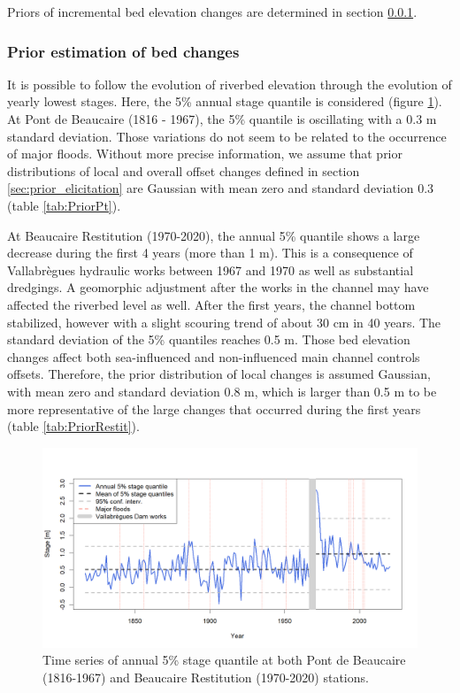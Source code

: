 \documentclass[11pt]{article}
\begin{document}
        Priors of incremental bed elevation changes are determined in section \ref{sec:stageevolution}.

    \subsubsection{Prior estimation of bed changes}
    \label{sec:stageevolution}
    
    It is possible to follow the evolution of riverbed elevation through the evolution of yearly lowest stages. Here, the 5\% annual stage quantile is considered (figure \ref{fig:quantile5_both}). At Pont de Beaucaire (1816 - 1967), the 5\% quantile is oscillating with a 0.3 m standard deviation. Those variations do not seem to be related to the occurrence of major floods. Without more precise information, we assume that prior distributions of local and overall offset changes defined in section \ref{sec:prior_elicitation} are Gaussian with mean zero and standard deviation 0.3 (table \ref{tab:PriorPt}).
    
    At Beaucaire Restitution (1970-2020), the annual 5\% quantile shows a large decrease during the first 4 years (more than 1 m). This is a consequence of Vallabrègues hydraulic works between 1967 and 1970 as well as substantial dredgings. A geomorphic adjustment after the works in the channel may have affected the riverbed level as well. After the first years, the channel bottom stabilized, however with a slight scouring trend of about 30 cm in 40 years. The standard deviation of the 5\% quantiles reaches 0.5 m. Those bed elevation changes affect both sea-influenced and non-influenced main channel controls offsets. Therefore, the prior distribution of local changes is assumed Gaussian, with mean zero and standard deviation 0.8 m, which is larger than 0.5 m to be more representative of the large changes that occurred during the first years (table \ref{tab:PriorRestit}).
    
    \begin{figure}[h!]
        \centering
        \includegraphics[width = 15cm]{Figs/5-Quant5perc_both.png}
        \caption{Time series of annual 5\% stage quantile at both Pont de Beaucaire (1816-1967) and Beaucaire Restitution (1970-2020) stations.}
        \label{fig:quantile5_both}
    \end{figure}
            
\end{document}
